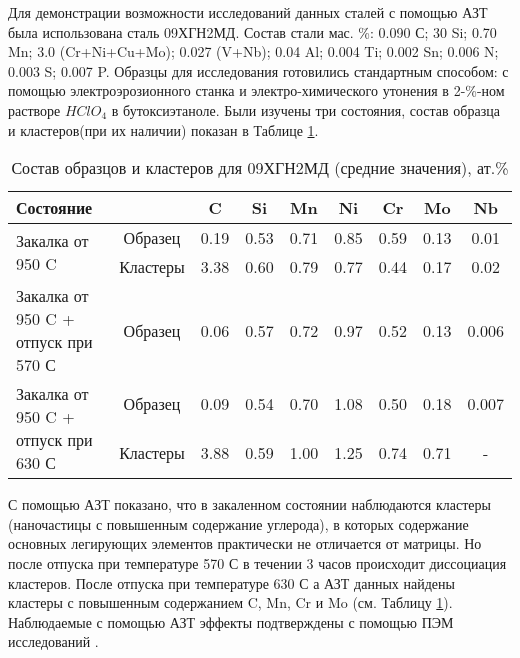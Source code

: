 Для демонстрации возможности исследований данных сталей с помощью АЗТ была использована сталь 09ХГН2МД. Состав стали мас. \%: 0.090 С; 30 Si; 0.70 Mn; 3.0 (Cr+Ni+Cu+Mo); 0.027 (V+Nb); 0.04 Al; 0.004 Ti; 0.002 Sn; 0.006 N; 0.003 S; 0.007 P. Образцы для исследования готовились стандартным способом: с помощью электроэрозионного станка и электро-химического утонения в 2-\%-ном растворе $HClO_{4}$ в бутоксиэтаноле. Были изучены три состояния,  состав образца и кластеров(при их наличии) показан в Таблице \cref{tab:SteelComposition09X}.


\begin{table} [htbp]
	\centering
	\caption{Состав образцов и кластеров для 09ХГН2МД (средние значения), ат.\%}
	\label{tab:SteelComposition09X}%
	\begin{SingleSpace}
		\begin{tabular}{| p{4.5cm} | c | c | c | c | c | c | c | c |}
			\hline
			Состояние & & C & Si & Mn & Ni & Cr & Mo & Nb     \\ \hline
			\multirow{2}{*}{Закалка от 950 \textdegree C} & Образец & 0.19 & 0.53 & 0.71 & 0.85 & 0.59 & 0.13 & 0.01    \\ \cline{2-9}
			& Кластеры & 3.38 & 0.60 & 0.79 & 0.77 & 0.44 & 0.17 & 0.02    \\  \hline		
			Закалка от 950 \textdegree C + отпуск при 570 \textdegree С & Образец & 0.06 & 0.57 & 0.72 & 0.97 & 0.52 & 0.13 & 0.006    \\ \hline
			\multirow{2}{45mm}{Закалка от 950 \textdegree C + отпуск при 630 \textdegree С} & Образец & 0.09 & 0.54 & 0.70 & 1.08 & 0.50 & 0.18 & 0.007    \\ \cline{2-9}
			& Кластеры & 3.88 & 0.59 & 1.00 & 1.25 & 0.74 & 0.71 & -    \\  \hline	
		\end{tabular}%
	\end{SingleSpace}
\end{table}

\FloatBarrier
С помощью АЗТ показано, что в закаленном состоянии наблюдаются кластеры (наночастицы с повышенным содержание углерода), в которых содержание основных легирующих элементов практически не отличается от матрицы. Но после отпуска при температуре 570 \textdegree С в течении 3 часов происходит диссоциация кластеров. После отпуска при температуре 630 \textdegree С а АЗТ данных найдены кластеры с повышенным содержанием C, Mn, Cr и Mo (см. Таблицу \cref{tab:SteelComposition09X}). Наблюдаемые с помощью АЗТ эффекты подтверждены с помощью ПЭМ исследований \cite{scbibGlubev}.

